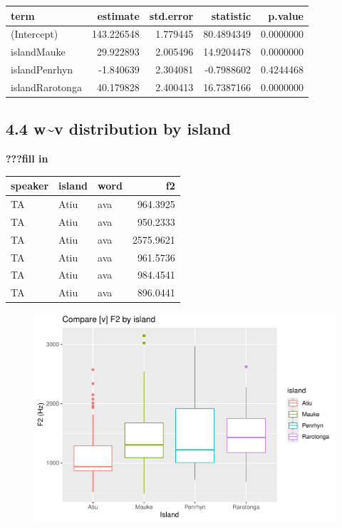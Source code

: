 \documentclass[
  ,man,floatsintext]{apa6}
\begin{document}
\begin{tabular}{l|r|r|r|r}
\hline
term & estimate & std.error & statistic & p.value\\
\hline
(Intercept) & 143.226548 & 1.779445 & 80.4894349 & 0.0000000\\
\hline
islandMauke & 29.922893 & 2.005496 & 14.9204478 & 0.0000000\\
\hline
islandPenrhyn & -1.840639 & 2.304081 & -0.7988602 & 0.4244468\\
\hline
islandRarotonga & 40.179828 & 2.400413 & 16.7387166 & 0.0000000\\
\hline
\end{tabular}

\subsection{4.4 w\textasciitilde v distribution by island}\label{wv-distribution-by-island}

\textbf{???fill in}

\begin{tabular}{l|l|l|r}
\hline
speaker & island & word & f2\\
\hline
TA & Atiu & ava & 964.3925\\
\hline
TA & Atiu & ava & 950.2333\\
\hline
TA & Atiu & ava & 2575.9621\\
\hline
TA & Atiu & ava & 961.5736\\
\hline
TA & Atiu & ava & 984.4541\\
\hline
TA & Atiu & ava & 896.0441\\
\hline
\end{tabular}

\begin{figure}
\includegraphics[width=0.75\linewidth]{D2_CIM_files/figure-latex/plot-f2-1} \caption{ }\label{fig:plot-f2}
\end{figure}
\end{document}
